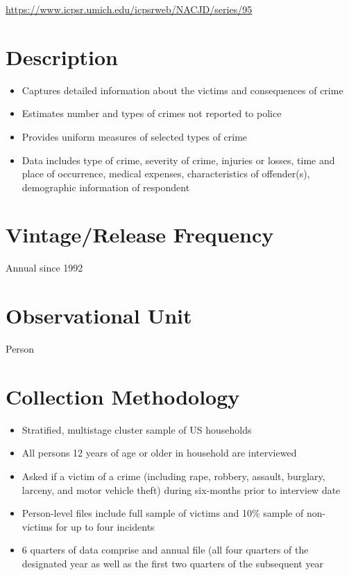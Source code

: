 \documentclass[
]{book}
\providecommand{\tightlist}{%
  \setlength{\itemsep}{0pt}\setlength{\parskip}{0pt}}
\begin{document}
\url{https://www.icpsr.umich.edu/icpsrweb/NACJD/series/95}

\hypertarget{description-45}{%
\section{Description}\label{description-45}}

\begin{itemize}
\tightlist
\item
  Captures detailed information about the victims and consequences of crime
\item
  Estimates number and types of crimes not reported to police
\item
  Provides uniform measures of selected types of crime
\item
  Data includes type of crime, severity of crime, injuries or losses, time and place of occurrence, medical expenses, characteristics of offender(s), demographic information of respondent
\end{itemize}

\hypertarget{vintagerelease-frequency-45}{%
\section{Vintage/Release Frequency}\label{vintagerelease-frequency-45}}

Annual since 1992

\hypertarget{observational-unit-45}{%
\section{Observational Unit}\label{observational-unit-45}}

Person

\hypertarget{collection-methodology-45}{%
\section{Collection Methodology}\label{collection-methodology-45}}

\begin{itemize}
\tightlist
\item
  Stratified, multistage cluster sample of US households
\item
  All persons 12 years of age or older in household are interviewed
\item
  Asked if a victim of a crime (including rape, robbery, assault, burglary, larceny, and motor vehicle theft) during six-months prior to interview date
\item
  Person-level files include full sample of victims and 10\% sample of non-victims for up to four incidents
\item
  6 quarters of data comprise and annual file (all four quarters of the designated year as well as the first two quarters of the subsequent year
\end{itemize}
\end{document}
